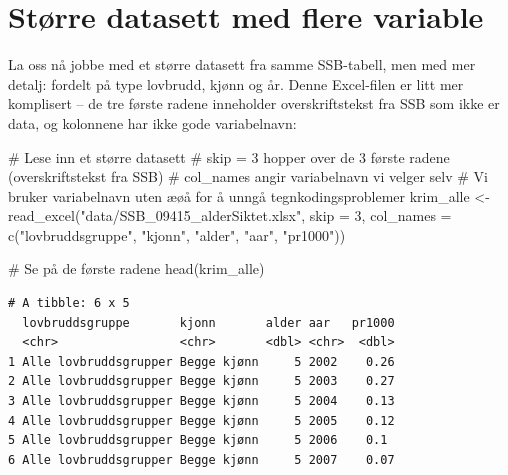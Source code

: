 \documentclass[
  norsk,
  letterpaper,
  DIV=11,
  numbers=noendperiod]{scrreprt}
\newenvironment{Shaded}{\begin{snugshade}}{\end{snugshade}}
\newcommand{\AttributeTok}[1]{\textcolor[rgb]{0.40,0.45,0.13}{#1}}
\newcommand{\CommentTok}[1]{\textcolor[rgb]{0.37,0.37,0.37}{#1}}
\newcommand{\DecValTok}[1]{\textcolor[rgb]{0.68,0.00,0.00}{#1}}
\newcommand{\FunctionTok}[1]{\textcolor[rgb]{0.28,0.35,0.67}{#1}}
\newcommand{\NormalTok}[1]{\textcolor[rgb]{0.00,0.23,0.31}{#1}}
\newcommand{\OtherTok}[1]{\textcolor[rgb]{0.00,0.23,0.31}{#1}}
\newcommand{\StringTok}[1]{\textcolor[rgb]{0.13,0.47,0.30}{#1}}
\theoremstyle{definition}
\theoremstyle{remark}
\begin{document}
\section{Større datasett med flere
variable}\label{stuxf8rre-datasett-med-flere-variable}

La oss nå jobbe med et større datasett fra samme SSB-tabell, men med mer
detalj: fordelt på type lovbrudd, kjønn og år. Denne Excel-filen er litt
mer komplisert -- de tre første radene inneholder overskriftstekst fra
SSB som ikke er data, og kolonnene har ikke gode variabelnavn:

\begin{Shaded}
\begin{Highlighting}[]
\CommentTok{\# Lese inn et større datasett}
\CommentTok{\# skip = 3 hopper over de 3 første radene (overskriftstekst fra SSB)}
\CommentTok{\# col\_names angir variabelnavn vi velger selv}
\CommentTok{\# Vi bruker variabelnavn uten æøå for å unngå tegnkodingsproblemer}
\NormalTok{krim\_alle }\OtherTok{\textless{}{-}} \FunctionTok{read\_excel}\NormalTok{(}\StringTok{"data/SSB\_09415\_alderSiktet.xlsx"}\NormalTok{,}
                         \AttributeTok{skip =} \DecValTok{3}\NormalTok{,}
                         \AttributeTok{col\_names =} \FunctionTok{c}\NormalTok{(}\StringTok{"lovbruddsgruppe"}\NormalTok{, }\StringTok{"kjonn"}\NormalTok{,}
                                       \StringTok{"alder"}\NormalTok{, }\StringTok{"aar"}\NormalTok{, }\StringTok{"pr1000"}\NormalTok{))}
\end{Highlighting}
\end{Shaded}

\begin{Shaded}
\begin{Highlighting}[]
\CommentTok{\# Se på de første radene}
\FunctionTok{head}\NormalTok{(krim\_alle)}
\end{Highlighting}
\end{Shaded}

\begin{verbatim}
# A tibble: 6 x 5
  lovbruddsgruppe       kjonn       alder aar   pr1000
  <chr>                 <chr>       <dbl> <chr>  <dbl>
1 Alle lovbruddsgrupper Begge kjønn     5 2002    0.26
2 Alle lovbruddsgrupper Begge kjønn     5 2003    0.27
3 Alle lovbruddsgrupper Begge kjønn     5 2004    0.13
4 Alle lovbruddsgrupper Begge kjønn     5 2005    0.12
5 Alle lovbruddsgrupper Begge kjønn     5 2006    0.1 
6 Alle lovbruddsgrupper Begge kjønn     5 2007    0.07
\end{verbatim}
\end{document}
